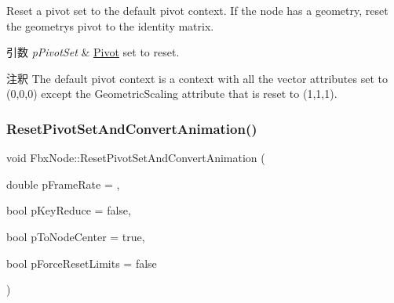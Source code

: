 Reset a pivot set to the default pivot context. If the node has a geometry, reset the geometry\textquotesingle{}s pivot to the identity matrix. 
\begin{DoxyParams}{引数}
{\em p\+Pivot\+Set} & \hyperlink{class_fbx_node_1_1_pivot}{Pivot} set to reset. \\
\hline
\end{DoxyParams}
\begin{DoxyRemark}{注釈}
The default pivot context is a context with all the vector attributes set to (0,0,0) except the Geometric\+Scaling attribute that is reset to (1,1,1). 
\end{DoxyRemark}
\mbox{\label{class_fbx_node_a0cebcf83a120fdb1c56c7f99cf9cf602}} 
\subsubsection{\texorpdfstring{Reset\+Pivot\+Set\+And\+Convert\+Animation()}{ResetPivotSetAndConvertAnimation()}}
{\footnotesize\ttfamily void Fbx\+Node\+::\+Reset\+Pivot\+Set\+And\+Convert\+Animation (\begin{DoxyParamCaption}\item[{double}]{p\+Frame\+Rate = {},  }\item[{bool}]{p\+Key\+Reduce = {\ttfamily false},  }\item[{bool}]{p\+To\+Node\+Center = {\ttfamily true},  }\item[{bool}]{p\+Force\+Reset\+Limits = {\ttfamily false} }\end{DoxyParamCaption})}

